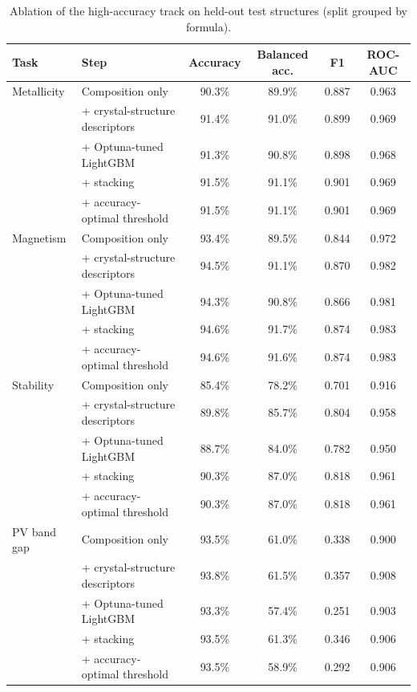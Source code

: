 \begin{table}[H]
\centering\small
\begin{tabular}{llcccc}
\toprule
Task & Step & Accuracy & Balanced acc. & F1 & ROC-AUC\\
\midrule
Metallicity & Composition only & 90.3\% & 89.9\% & 0.887 & 0.963 \\
 & + crystal-structure descriptors & 91.4\% & 91.0\% & 0.899 & 0.969 \\
 & + Optuna-tuned LightGBM & 91.3\% & 90.8\% & 0.898 & 0.968 \\
 & + stacking & 91.5\% & 91.1\% & 0.901 & 0.969 \\
 & + accuracy-optimal threshold & 91.5\% & 91.1\% & 0.901 & 0.969 \\
\midrule
Magnetism & Composition only & 93.4\% & 89.5\% & 0.844 & 0.972 \\
 & + crystal-structure descriptors & 94.5\% & 91.1\% & 0.870 & 0.982 \\
 & + Optuna-tuned LightGBM & 94.3\% & 90.8\% & 0.866 & 0.981 \\
 & + stacking & 94.6\% & 91.7\% & 0.874 & 0.983 \\
 & + accuracy-optimal threshold & 94.6\% & 91.6\% & 0.874 & 0.983 \\
\midrule
Stability & Composition only & 85.4\% & 78.2\% & 0.701 & 0.916 \\
 & + crystal-structure descriptors & 89.8\% & 85.7\% & 0.804 & 0.958 \\
 & + Optuna-tuned LightGBM & 88.7\% & 84.0\% & 0.782 & 0.950 \\
 & + stacking & 90.3\% & 87.0\% & 0.818 & 0.961 \\
 & + accuracy-optimal threshold & 90.3\% & 87.0\% & 0.818 & 0.961 \\
\midrule
PV band gap & Composition only & 93.5\% & 61.0\% & 0.338 & 0.900 \\
 & + crystal-structure descriptors & 93.8\% & 61.5\% & 0.357 & 0.908 \\
 & + Optuna-tuned LightGBM & 93.3\% & 57.4\% & 0.251 & 0.903 \\
 & + stacking & 93.5\% & 61.3\% & 0.346 & 0.906 \\
 & + accuracy-optimal threshold & 93.5\% & 58.9\% & 0.292 & 0.906 \\
\bottomrule
\end{tabular}
\caption{Ablation of the high-accuracy track on held-out test structures (split grouped by formula).}\label{tab:hiacc-ablation}
\end{table}
